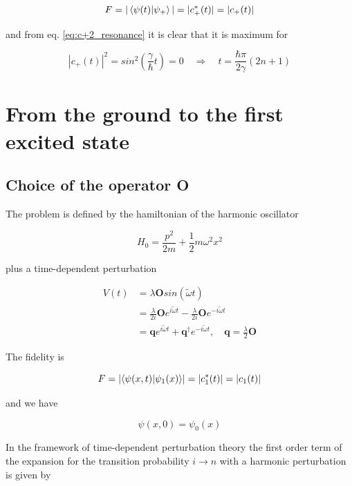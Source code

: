 \documentclass{article}
\begin{document}
\begin{equation}
F = |\braket{\psi(t)}{\psi_+}| = |c_+^*(t)| = |c_+(t)|
\end{equation}

and from eq. \eqref{eq:c+2_resonance} it is clear that it is maximum for

\begin{equation}
|c_+(t)|^2 = sin^2\left(\frac{\gamma}{\hbar}t\right) = 0 \quad \Rightarrow \quad t = \frac{\hbar \pi}{2 \gamma} (2n +1)
\end{equation}

\section{From the ground to the first excited state}

\subsection{Choice of the operator O}

The problem is defined by the hamiltonian of the harmonic oscillator

\begin{equation}
H_0 = \frac{p^2}{2m} + \frac{1}{2} m \omega^2 x^2
\end{equation}

plus a time-dependent perturbation

\begin{align}
V(t) & = \lambda \bm{O} sin(\tilde{\omega}t) \nonumber \\
& = \frac{\lambda}{2i} \bm{O} e^{i\tilde{\omega}t} - \frac{\lambda}{2i} \bm{O} e^{-i\tilde{\omega}t} \nonumber \\
& = \bm{q} e^{i\tilde{\omega}t} + \bm{q}^{\dagger} e^{-i\tilde{\omega}t}, \quad \bm{q} = \frac{\lambda}{2} \bm{O}
\end{align}

The fidelity is

\begin{equation}
F = \left| \braket{\psi(x,t)}{\psi_1(x)} \right| = \left| c_1^*(t) \right| = \left| c_1(t) \right|
\end{equation}

and we have

\begin{equation}
\psi(x,0) = \psi_0(x)
\end{equation}

In the framework of time-dependent perturbation theory the first order term of the expansion for the transition probability \( i \rightarrow n \) with a harmonic perturbation is given by
\end{document}
